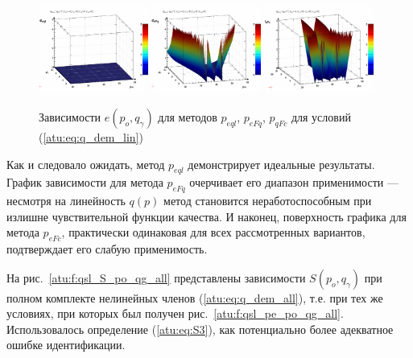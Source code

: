 \begin{figure}[htb!]
  \centerline{
    \includegraphics[width=0.32\textwidth]{p/qls_pe-p_po_qg_eql_lin.png}
    \hfill
    \includegraphics[width=0.32\textwidth]{p/qls_pe-p_po_qg_eFq_lin.png}
    \hfill
    \includegraphics[width=0.32\textwidth]{p/qls_pe-p_po_qg_eFc_lin.png}
  }
  \caption{Зависимости $e(p_o,q_\gamma)$ для методов $p_{eql}$, $p_{eFq}$, $p_{qFc}$ для условий (\ref{atu:eq:q_dem_lin})}
  \label{atu:f:qsl_pe_po_qg_lin}
\end{figure}

Как и следовало ожидать, метод $p_{eql}$
демонстрирует идеальные результаты.
График зависимости для метода $p_{eFq}$
очерчивает его диапазон применимости --- несмотря
на линейность $q(p)$ метод становится неработоспособным при
излишне чувствительной функции качества.
И наконец, поверхность графика для метода $p_{eFc}$,
практически одинаковая для всех рассмотренных вариантов,
подтверждает его слабую применимость.



На рис.~\ref{atu:f:qsl_S_po_qg_all} представлены зависимости $S(p_o,q_\gamma)$
при полном комплекте нелинейных членов (\ref{atu:eq:q_dem_all}),
т.е. при тех же условиях, при которых был получен рис.~\ref{atu:f:qsl_pe_po_qg_all}.
Использовалось определение (\ref{atu:eq:S3}), как потенциально более
адекватное ошибке идентификации.

